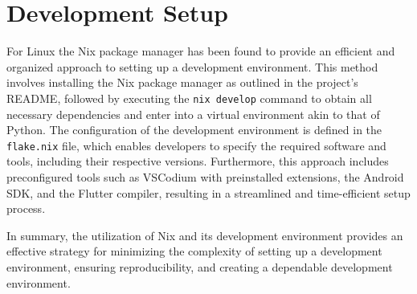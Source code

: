 \documentclass[conference]{IEEEtran}
\begin{document}
\section{Development Setup}

For Linux the Nix package manager has been found to provide an efficient and organized approach to setting up a development environment. This method involves installing the Nix package manager as outlined in the project's README, followed by executing the \texttt{nix develop} command to obtain all necessary dependencies and enter into a virtual environment akin to that of Python. The configuration of the development environment is defined in the \texttt{flake.nix} file, which enables developers to specify the required software and tools, including their respective versions. Furthermore, this approach includes preconfigured tools such as VSCodium with preinstalled extensions, the Android SDK, and the Flutter compiler, resulting in a streamlined and time-efficient setup process.

In summary, the utilization of Nix and its development environment provides an effective strategy for minimizing the complexity of setting up a development environment, ensuring reproducibility, and creating a dependable development environment.

\end{document}
